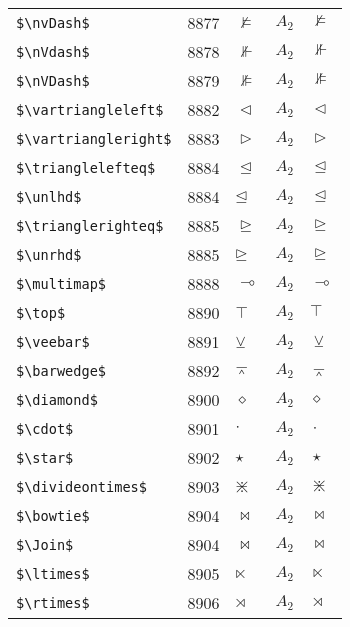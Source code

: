 \documentclass{article}
\begin{document}
\begin{table}
\begin{center}
\begin{tabular}{llll}
 \verb#$\nvDash$#           & 8877    & $\nvDash$           & $A_2\quad \nvDash$\\
 \verb#$\nVdash$#           & 8878    & $\nVdash$           & $A_2\quad \nVdash$\\
 \verb#$\nVDash$#           & 8879    & $\nVDash$           & $A_2\quad \nVDash$\\
 \verb#$\vartriangleleft$#  & 8882    & $\vartriangleleft$  & $A_2\quad \vartriangleleft$\\
 \verb#$\vartriangleright$# & 8883    & $\vartriangleright$ & $A_2\quad \vartriangleright$\\
 \verb#$\trianglelefteq$#   & 8884    & $\trianglelefteq$   & $A_2\quad \trianglelefteq$\\
 \verb#$\unlhd$#            & 8884    & $\unlhd$            & $A_2\quad \unlhd$\\
 \verb#$\trianglerighteq$#  & 8885    & $\trianglerighteq$  & $A_2\quad \trianglerighteq$\\
 \verb#$\unrhd$#            & 8885    & $\unrhd$            & $A_2\quad \unrhd$\\
 \verb#$\multimap$#         & 8888    & $\multimap$         & $A_2\quad \multimap$\\
 \verb#$\top$#              & 8890    & $\top$              & $A_2\quad \top$\\
 \verb#$\veebar$#           & 8891    & $\veebar$           & $A_2\quad \veebar$\\
 \verb#$\barwedge$#         & 8892    & $\barwedge$         & $A_2\quad \barwedge$\\
 \verb#$\diamond$#          & 8900    & $\diamond$          & $A_2\quad \diamond$\\
 \verb#$\cdot$#             & 8901    & $\cdot$             & $A_2\quad \cdot$\\
 \verb#$\star$#             & 8902    & $\star$             & $A_2\quad \star$\\
 \verb#$\divideontimes$#    & 8903    & $\divideontimes$    & $A_2\quad \divideontimes$\\
 \verb#$\bowtie$#           & 8904    & $\bowtie$           & $A_2\quad \bowtie$\\
 \verb#$\Join$#             & 8904    & $\Join$             & $A_2\quad \Join$\\
 \verb#$\ltimes$#           & 8905    & $\ltimes$           & $A_2\quad \ltimes$\\
 \verb#$\rtimes$#           & 8906    & $\rtimes$           & $A_2\quad \rtimes$\\

\end{tabular}
\end{center}
\end{table}
\end{document}
